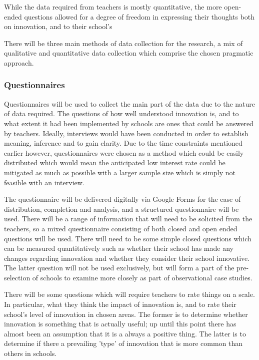 While the data required from teachers is mostly quantitative, the more open-ended questions allowed for a degree of freedom in expressing their thoughts both on innovation, and to their school's 

There will be three main methods of data collection for the research, a mix of qualitative and quantitative data collection which comprise the chosen pragmatic approach.

\subsubsection{Questionnaires}
Questionnaires will be used to collect the main part of the data due to the nature of data required. The questions of how well understood innovation is, and to what extent it had been implemented by schools are ones that could be answered by teachers. Ideally, interviews would have been conducted in order to establish meaning, inference and to gain clarity. Due to the time constraints mentioned earlier however, questionnaires were chosen as a method which could be easily distributed which would mean the anticipated low interest rate could be mitigated as much as possible with a larger sample size which is simply not feasible with an interview.

The questionnaire will be delivered digitally via Google Forms for the ease of distribution, completion and analysis, and a structured questionnaire will be used. There will be a range of information that will need to be solicited from the teachers, so a mixed questionnaire consisting of both closed and open ended questions will be used. There will need to be some simple closed questions which can be measured quantitatively such as whether their school has made any changes regarding innovation and whether they consider their school innovative. The latter question will not be used exclusively, but will form a part of the pre-selection of schools to examine more closely as part of observational case studies.

There will be some questions which will require teachers to rate things on a scale. In particular, what they think the impact of innovation is, and to rate their school's level of innovation in chosen areas. The former is to determine whether innovation is something that is actually useful; up until this point there has almost been an assumption that it is a always a positive thing. The latter is to determine if there a prevailing 'type' of innovation that is more common than others in schools.

